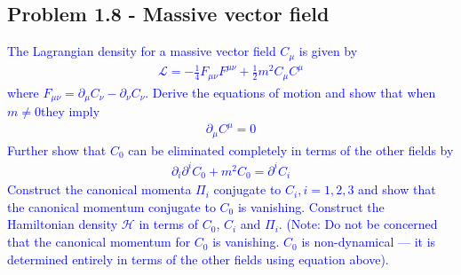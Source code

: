 \documentclass[../main.tex]{subfiles}
\begin{document}
\subsection{Problem 1.8 - Massive vector field}

\textcolor{blue}{
The Lagrangian density for a massive vector field $C_\mu$ is given by
\begin{align}
\mathcal{L}=-\frac{1}{4}F_{\mu\nu}F^{\mu\nu}+\frac{1}{2}m^2C_\mu C^\mu
\end{align}
where $F_{\mu\nu}=\partial_\mu C_\nu-\partial_\nu C_\nu$. Derive the equations of motion and show that when $m\neq0$they imply
\begin{align}
\partial_\mu C^\mu=0
\end{align}
Further show that $C_0$ can be eliminated completely in terms of the other fields by
\begin{align}
\partial_i\partial^iC_0+m^2C_0=\partial^iC_i
\end{align}
Construct the canonical momenta $\Pi_i$ conjugate to $C_i, i = 1,2,3$ and show that the canonical momentum conjugate to $C_0$ is vanishing. Construct the Hamiltonian density
$\mathcal{H}$ in terms of $C_0$, $C_i$ and $\Pi_i$. (Note: Do not be concerned that the canonical momentum for $C_0$ is vanishing. $C_0$ is non-dynamical — it is determined entirely in terms of
the other fields using equation above).
}\newline
\end{document}

